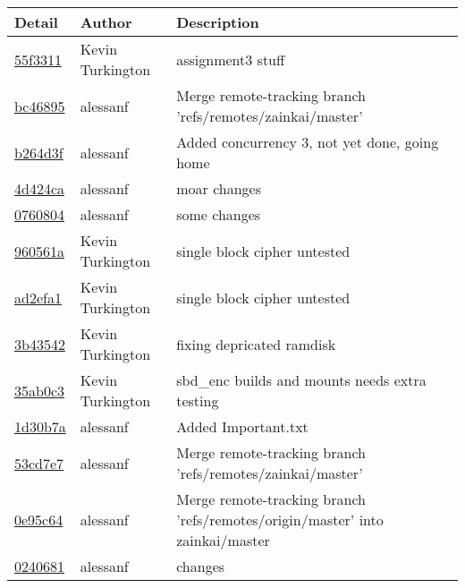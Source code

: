 \begin{tabular}{l l l}\textbf{Detail} & \textbf{Author} & \textbf{Description}\\\hline
\href{https://github.com/zainkai/CS444/commit/55f3311a7874136a1a8823af1951a9ad76e43ba2}{55f3311} & Kevin Turkington & assignment3 stuff\\\hline
\href{https://github.com/zainkai/CS444/commit/bc46895c7f20e41317aca4982660dc4f90487eba}{bc46895} & alessanf & Merge remote-tracking branch 'refs/remotes/zainkai/master'\\\hline
\href{https://github.com/zainkai/CS444/commit/b264d3f48c9cabc69400904cc165390d74d69b6c}{b264d3f} & alessanf & Added concurrency 3, not yet done, going home\\\hline
\href{https://github.com/zainkai/CS444/commit/4d424ca562c2a66e6c48ed010ed0418cd7e30546}{4d424ca} & alessanf & moar changes\\\hline
\href{https://github.com/zainkai/CS444/commit/0760804acf2700b65a34f194019aba221c491f02}{0760804} & alessanf & some changes\\\hline
\href{https://github.com/zainkai/CS444/commit/960561aa7b84201265df2908679e0c97c1ba645d}{960561a} & Kevin Turkington & single block cipher untested\\\hline
\href{https://github.com/zainkai/CS444/commit/ad2efa13d2578b33be8bc69e5e2558e1d0025e50}{ad2efa1} & Kevin Turkington & single block cipher untested\\\hline
\href{https://github.com/zainkai/CS444/commit/3b435423637c5718ddacd858aeea700337e56fd4}{3b43542} & Kevin Turkington & fixing depricated ramdisk\\\hline
\href{https://github.com/zainkai/CS444/commit/35ab0c34409802212937b5326491a68f43ab3edf}{35ab0c3} & Kevin Turkington &
sbd\_enc builds and mounts needs extra testing\\\hline
\href{https://github.com/zainkai/CS444/commit/1d30b7afe13f372b6fe1c6077d0561633374e950}{1d30b7a} & alessanf & Added Important.txt\\\hline
\href{https://github.com/zainkai/CS444/commit/53cd7e742a1cd61645237babc430db41392411da}{53cd7e7} & alessanf & Merge remote-tracking branch 'refs/remotes/zainkai/master'\\\hline
\href{https://github.com/zainkai/CS444/commit/0e95c6478aa22a3225d0411eae6bc6d56fd95577}{0e95c64} & alessanf & Merge remote-tracking branch 'refs/remotes/origin/master' into zainkai/master\\\hline
\href{https://github.com/zainkai/CS444/commit/02406815336f99698c8521b3659e7834e0756417}{0240681} & alessanf & changes\\\hline

\end{tabular}

